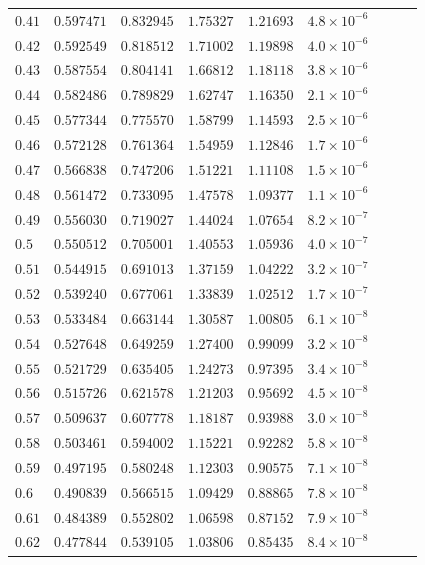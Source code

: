 \documentclass[12pt]{extarticle}
\theoremstyle{plain}
\theoremstyle{remark}
\begin{document}
\begin{longtable}{lcccccccc}
$0.41$ & $0.597471$ & $0.832945$ & $1.75327$ & $1.21693$ & $4.8\times10^{-6}$ \\
$0.42$ & $0.592549$ & $0.818512$ & $1.71002$ & $1.19898$ & $4.0\times10^{-6}$ \\
$0.43$ & $0.587554$ & $0.804141$ & $1.66812$ & $1.18118$ & $3.8\times10^{-6}$ \\
$0.44$ & $0.582486$ & $0.789829$ & $1.62747$ & $1.16350$ & $2.1\times10^{-6}$ \\
$0.45$ & $0.577344$ & $0.775570$ & $1.58799$ & $1.14593$ & $2.5\times10^{-6}$ \\
$0.46$ & $0.572128$ & $0.761364$ & $1.54959$ & $1.12846$ & $1.7\times10^{-6}$ \\
$0.47$ & $0.566838$ & $0.747206$ & $1.51221$ & $1.11108$ & $1.5\times10^{-6}$ \\
$0.48$ & $0.561472$ & $0.733095$ & $1.47578$ & $1.09377$ & $1.1\times10^{-6}$ \\
$0.49$ & $0.556030$ & $0.719027$ & $1.44024$ & $1.07654$ & $8.2\times10^{-7}$ \\
$0.5$ & $0.550512$ & $0.705001$ & $1.40553$ & $1.05936$ & $4.0\times10^{-7}$ \\
$0.51$ & $0.544915$ & $0.691013$ & $1.37159$ & $1.04222$ & $3.2\times10^{-7}$ \\
$0.52$ & $0.539240$ & $0.677061$ & $1.33839$ & $1.02512$ & $1.7\times10^{-7}$ \\
$0.53$ & $0.533484$ & $0.663144$ & $1.30587$ & $1.00805$ & $6.1\times10^{-8}$ \\
$0.54$ & $0.527648$ & $0.649259$ & $1.27400$ & $0.99099$ & $3.2\times10^{-8}$ \\
$0.55$ & $0.521729$ & $0.635405$ & $1.24273$ & $0.97395$ & $3.4\times10^{-8}$ \\
$0.56$ & $0.515726$ & $0.621578$ & $1.21203$ & $0.95692$ & $4.5\times10^{-8}$ \\
$0.57$ & $0.509637$ & $0.607778$ & $1.18187$ & $0.93988$ & $3.0\times10^{-8}$ \\
$0.58$ & $0.503461$ & $0.594002$ & $1.15221$ & $0.92282$ & $5.8\times10^{-8}$ \\
$0.59$ & $0.497195$ & $0.580248$ & $1.12303$ & $0.90575$ & $7.1\times10^{-8}$ \\
$0.6$ & $0.490839$ & $0.566515$ & $1.09429$ & $0.88865$ & $7.8\times10^{-8}$ \\
$0.61$ & $0.484389$ & $0.552802$ & $1.06598$ & $0.87152$ & $7.9\times10^{-8}$ \\
$0.62$ & $0.477844$ & $0.539105$ & $1.03806$ & $0.85435$ & $8.4\times10^{-8}$ \\

\end{longtable}
\end{document}
